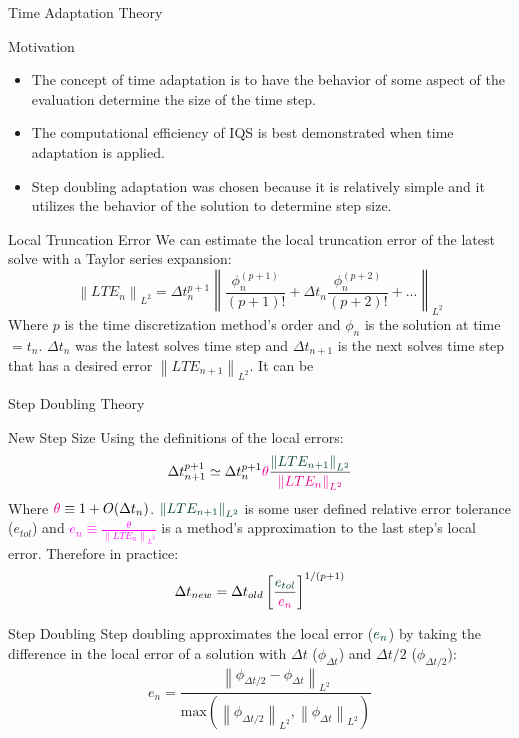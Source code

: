 \documentclass[8pt,xcolor=dvipnames]{beamer}
\newcommand{\be}{\begin{equation*}}
\newcommand{\ee}{\end{equation*}}
\newcommand{\norm}[1]{\left\lVert#1\right\rVert_{L^2}}
\newcommand{\tcm}[1]{\textcolor{magenta}{#1}}
\newcommand{\tcg}[1]{\textcolor{britishracinggreen}{#1}}
\begin{document}
\begin{frame}{Time Adaptation Theory}

\begin{block}{Motivation}
\begin{itemize}
\item The concept of time adaptation is to have the behavior of some aspect of the evaluation determine the size of the time step.
\item The computational efficiency of IQS is best demonstrated when time adaptation is applied.
\item Step doubling adaptation was chosen because it is relatively simple and it utilizes the behavior of the solution to determine step size.
\end{itemize}
\end{block}

\begin{block}{Local Truncation Error}
We can estimate the local truncation error of the latest solve with a Taylor series expansion:
\be
\norm{LTE_n} = \Delta t_n^{p+1} \norm{\frac{\phi^{(p+1)}_{n}}{(p+1)!} + \Delta t_n \frac{\phi^{(p+2)}_{n}}{(p+2)!} + ...}
\ee
Where $p$ is the time discretization method's order and $\phi_n$ is the solution at time $ = t_n$. $\Delta t_n$ was the latest solves time step and $\Delta t_{n+1}$ is the next solves time step that has a desired error $\norm{LTE_{n+1}}$.  It can be
\end{block}

\end{frame}


\begin{frame}{Step Doubling Theory}

\begin{block}{New Step Size}
Using the definitions of the local errors:
\be
\Delta t_{n+1}^{p+1} \simeq \Delta t_{n}^{p+1} \tcm{\theta} \frac{\tcg{\norm{LTE_{n+1}}}}{\tcm{\norm{LTE_{n}}}}
\ee
Where $\tcm{\theta} \equiv 1 + O(\Delta t_n)$. $\tcg{\norm{LTE_{n+1}}}$ is some user defined relative error tolerance (\tcg{$e_{tol}$}) and \tcm{$e_n \equiv \frac{\theta}{\norm{LTE_{n}}}$} is a method's approximation to the last step's local error.  Therefore in practice:
\be
\Delta t_{new} = \Delta t_{old} \left[\frac{\tcg{e_{tol}}}{\tcm{e_n}}\right]^{1/(p+1)}
\ee
\end{block}

\begin{block}{Step Doubling}
Step doubling approximates the local error ($\tcg{e_n}$) by taking the difference in the local error of a solution with $\Delta t$ ($\phi_{\Delta t}$) and $\Delta t/2$ ($\phi_{\Delta t/2}$):
\be
e_n = \frac{\norm{\phi_{\Delta t/2} - \phi_{\Delta t}}}{\text{max}\left(\norm{\phi_{\Delta t/2}},\norm{\phi_{\Delta t}}\right)}
\ee
\end{block}

\end{frame}
\end{document}
